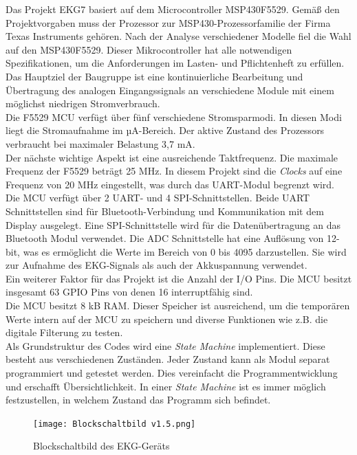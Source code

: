 Das Projekt EKG7 basiert auf dem Microcontroller MSP430F5529. Gemäß den Projektvorgaben muss der Prozessor zur MSP430-Prozessorfamilie der Firma Texas Instruments gehören. Nach der Analyse verschiedener Modelle fiel die Wahl auf den MSP430F5529. Dieser Mikrocontroller hat alle notwendigen Spezifikationen, um die Anforderungen im Lasten- und Pflichtenheft zu erfüllen.\\
Das Hauptziel der Baugruppe ist eine kontinuierliche Bearbeitung und Übertragung des analogen Eingangssignals an verschiedene Module mit einem möglichst niedrigen Stromverbrauch.\\
Die F5529 MCU verfügt über fünf verschiedene Stromsparmodi. In diesen Modi liegt die Stromaufnahme im µA-Bereich. Der aktive Zustand des Prozessors verbraucht bei maximaler Belastung 3,7 mA.\\
Der nächste wichtige Aspekt ist eine ausreichende Taktfrequenz. Die maximale Frequenz der F5529 beträgt 25 MHz. In diesem Projekt sind die \textit{Clocks} auf eine Frequenz von 20 MHz eingestellt, was durch das UART-Modul begrenzt wird.\\
Die MCU verfügt über 2 UART- und 4 SPI-Schnittstellen. Beide UART Schnittstellen sind für Bluetooth-Verbindung und Kommunikation mit dem Display ausgelegt. Eine SPI-Schnittstelle wird für die Datenübertragung an das Bluetooth Modul verwendet.
Die ADC Schnittstelle hat eine Auflösung von 12-bit, was es ermöglicht die Werte im Bereich von 0 bis 4095 darzustellen. Sie wird zur Aufnahme des EKG-Signals als auch der Akkuspannung verwendet.\\ 
Ein weiterer Faktor für das Projekt ist die Anzahl der I/O Pins. Die MCU besitzt insgesamt 63 GPIO Pins von denen 16 interruptfähig sind.\\
Die MCU besitzt 8 kB RAM. Dieser Speicher ist ausreichend, um die temporären Werte intern auf der MCU zu speichern und diverse Funktionen wie z.B. die digitale Filterung zu testen.\\

Als Grundstruktur des Codes wird eine \textit{State Machine} implementiert. Diese besteht aus verschiedenen Zuständen. Jeder Zustand kann als Modul separat programmiert und getestet werden. Dies vereinfacht die Programmentwicklung und erschafft Übersichtlichkeit. In einer \textit{State Machine} ist es immer möglich festzustellen, in welchem Zustand das Programm sich befindet.\\

\begin{figure} [h]
	\texttt{[image: Blockschaltbild v1.5.png]}
	\caption{Blockschaltbild des EKG-Geräts}
	\label{fig_Blockschaltbild} 
\end{figure}


